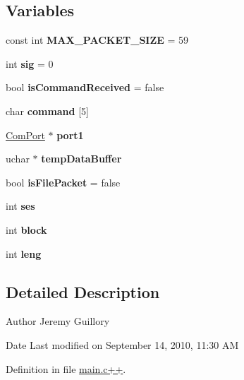 \subsection*{Variables}
\begin{DoxyCompactItemize}
\item 
\hypertarget{main_8c_09_09_a0c30828d4cc483a0fbf6de0696834909}{
const int {\bfseries MAX\_\-PACKET\_\-SIZE} = 59}
\label{main_8c_09_09_a0c30828d4cc483a0fbf6de0696834909}

\item 
\hypertarget{main_8c_09_09_a68be1f65e6d1f2949835d9b6b44bcf8e}{
int {\bfseries sig} = 0}
\label{main_8c_09_09_a68be1f65e6d1f2949835d9b6b44bcf8e}

\item 
\hypertarget{main_8c_09_09_a2fd1e6fd28793c225f46fb7ef1ff8556}{
bool {\bfseries isCommandReceived} = false}
\label{main_8c_09_09_a2fd1e6fd28793c225f46fb7ef1ff8556}

\item 
\hypertarget{main_8c_09_09_a273127dc7aa7a815abef121f7fb3bd90}{
char {\bfseries command} \mbox{[}5\mbox{]}}
\label{main_8c_09_09_a273127dc7aa7a815abef121f7fb3bd90}

\item 
\hypertarget{main_8c_09_09_a63d1c87e88c3f67e6bbe833505677d57}{
\hyperlink{class_com_port}{ComPort} $\ast$ {\bfseries port1}}
\label{main_8c_09_09_a63d1c87e88c3f67e6bbe833505677d57}

\item 
\hypertarget{main_8c_09_09_a2b2c999da761f10734843bf52e70c430}{
uchar $\ast$ {\bfseries tempDataBuffer}}
\label{main_8c_09_09_a2b2c999da761f10734843bf52e70c430}

\item 
\hypertarget{main_8c_09_09_a580cd1c0e3067b18b9de515e7c61dac1}{
bool {\bfseries isFilePacket} = false}
\label{main_8c_09_09_a580cd1c0e3067b18b9de515e7c61dac1}

\item 
\hypertarget{main_8c_09_09_aaecf401f570ab56b5ceceb14d10fb167}{
int {\bfseries ses}}
\label{main_8c_09_09_aaecf401f570ab56b5ceceb14d10fb167}

\item 
\hypertarget{main_8c_09_09_a6f5f3480b66f3cc414fd0d6dfcf54046}{
int {\bfseries block}}
\label{main_8c_09_09_a6f5f3480b66f3cc414fd0d6dfcf54046}

\item 
\hypertarget{main_8c_09_09_af1d915d4a4c90d4fe443eb08234e79a0}{
int {\bfseries leng}}
\label{main_8c_09_09_af1d915d4a4c90d4fe443eb08234e79a0}

\end{DoxyCompactItemize}


\subsection{Detailed Description}
\begin{DoxyAuthor}{Author}
Jeremy Guillory
\end{DoxyAuthor}
\begin{DoxyDate}{Date}
Last modified on September 14, 2010, 11:30 AM 
\end{DoxyDate}


Definition in file \hyperlink{main_8c_09_09_source}{main.c++}.

